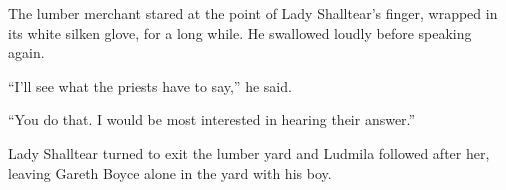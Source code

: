  

The lumber merchant stared at the point of Lady Shalltear’s finger, wrapped in its white silken glove, for a long while. He swallowed loudly before speaking again.

 

“I’ll see what the priests have to say,” he said.

 

“You do that. I would be most interested in hearing their answer.”

 

Lady Shalltear turned to exit the lumber yard and Ludmila followed after her, leaving Gareth Boyce alone in the yard with his boy.